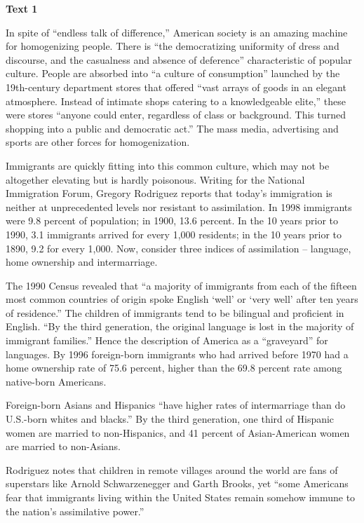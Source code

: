\begin{center}\textbf{Text 1}\end{center}

\qquad In spite of “endless talk of difference,” American society is an amazing machine for homogenizing people. There is “the democratizing uniformity of dress and discourse, and the casualness and absence of deference” characteristic of popular culture. People are absorbed into “a culture of consumption” launched by the 19th-century department stores that offered “vast arrays of goods in an elegant atmosphere. Instead of intimate shops catering to a knowledgeable elite,” these were stores “anyone could enter, regardless of class or background. This turned shopping into a public and democratic act.” The mass media, advertising and sports are other forces for homogenization.

\qquad Immigrants are quickly fitting into this common culture, which may not be altogether elevating but is hardly poisonous. Writing for the National Immigration Forum, Gregory Rodriguez reports that today’s immigration is neither at unprecedented levels nor resistant to assimilation. In 1998 immigrants were 9.8 percent of population; in 1900, 13.6 percent. In the 10 years prior to 1990, 3.1 immigrants arrived for every 1,000 residents; in the 10 years prior to 1890, 9.2 for every 1,000. Now, consider three indices of assimilation -- language, home ownership and intermarriage.

\qquad The 1990 Census revealed that “a majority of immigrants from each of the fifteen most common countries of origin spoke English ‘well’ or ‘very well’ after ten years of residence.” The children of immigrants tend to be bilingual and proficient in English. “By the third generation, the original language is lost in the majority of immigrant families.” Hence the description of America as a “graveyard” for languages. By 1996 foreign-born immigrants who had arrived before 1970 had a home ownership rate of 75.6 percent, higher than the 69.8 percent rate among native-born Americans.

\qquad Foreign-born Asians and Hispanics “have higher rates of intermarriage than do U.S.-born whites and blacks.” By the third generation, one third of Hispanic women are married to non-Hispanics, and 41 percent of Asian-American women are married to non-Asians.

\qquad Rodriguez notes that children in remote villages around the world are fans of superstars like Arnold Schwarzenegger and Garth Brooks, yet “some Americans fear that immigrants living within the United States remain somehow immune to the nation’s assimilative power.”

